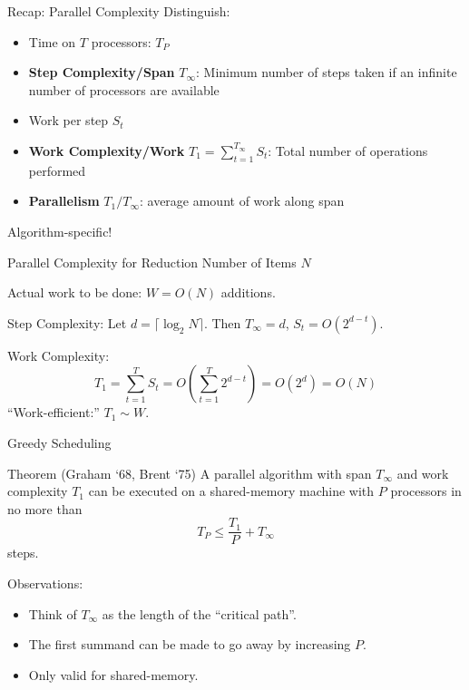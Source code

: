\documentclass[english,compress]{beamer}
\begin{document}
\begin{frame}{Recap: Parallel Complexity}
  Distinguish:
  \begin{itemize}
    \item Time on $T$ processors: $T_P$
    \item \textbf{Step Complexity/Span} $T_\infty$: Minimum number of steps taken if
    an infinite number of processors are available
    \item Work per step $S_t$
    \item \textbf{Work Complexity/Work} $T_1=\sum_{t=1}^{T_\infty} S_t$: Total number of operations performed
    \item \textbf{Parallelism} $T_1/T_\infty$: average amount of work
    along span
  \end{itemize}
  Algorithm-specific!
\end{frame}
\begin{frame}{Parallel Complexity for Reduction}
  Number of Items $N$

  Actual work to be done: $W=O(N)$ additions.

  \medskip
  Step Complexity: Let $d=\lceil \log_2 N\rceil$.
  Then $T_\infty=d$, $S_t=O(2^{d-t})$.

  \medskip
  Work Complexity:
  \[
    T_1 = \sum_{t=1}^T S_t = O\left(\sum_{t=1}^T 2^{d-t}\right)
    = O(2^d)=O(N)
  \]
  \pause
  ``Work-efficient:'' $T_1 \sim W$.
\end{frame}
\begin{frame}{Greedy Scheduling}
  \begin{block}{Theorem (Graham `68, Brent `75)}
  A parallel algorithm with span $T_\infty$ and work complexity
  $T_1$ can be executed on a shared-memory machine with $P$ processors
  in no more than
  \[
    T_P \le \frac {T_1}P+T_\infty
  \]
  steps.
  \end{block}
  \bigskip
  Observations:
  \begin{itemize}
    \item Think of $T_\infty$ as the length of the ``critical path''.
    \item The first summand can be made to go away by increasing $P$.
    \item Only valid for shared-memory.
  \end{itemize}
\end{frame}
\end{document}

